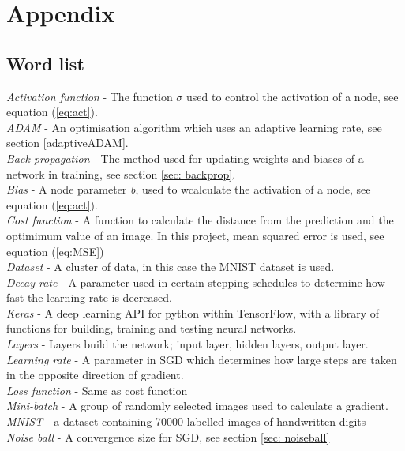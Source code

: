 \documentclass{article}
\begin{document}
\newpage
\section{Appendix}
\subsection{Word list}
\textit{Activation function} - The function $\sigma$ used to control the activation of a node, see equation (\ref{eq:act}).\\ [0.75ex]
\textit{ADAM} - An optimisation algorithm which uses an adaptive learning rate, see section \ref{adaptiveADAM}.\\[0.75ex]
\textit{Back propagation} - The method used for updating weights and biases of a network in training, see section \ref{sec: backprop}.\\[0.75ex]
\textit{Bias} - A node parameter \textit{b}, used to wcalculate the activation of a node, see equation (\ref{eq:act}).\\[0.75ex]
\textit{Cost function} - A function to calculate the distance from the prediction and the optimimum value of an image. In this project, mean squared error is used, see equation (\ref{eq:MSE}) \\[0.75ex]
\textit{Dataset} - A cluster of data, in this case the MNIST dataset is used.\\[0.75ex]
\textit{Decay rate} - A parameter used in certain stepping schedules to determine how fast the learning rate is decreased.\\[0.75ex]
\textit{Keras} - A deep learning API for python within TensorFlow, with a library of functions for building, training and testing neural networks.\\[0.75ex]
\textit{Layers} - Layers build the network; input layer, hidden layers, output layer. \\[0.75ex]
\textit{Learning rate} - A parameter in SGD which determines how large steps are taken in the opposite direction of gradient.\\[0.75ex]
\textit{Loss function} - Same as cost function\\[0.75ex]
\textit{Mini-batch} - A group of randomly selected images used to calculate a gradient. \\[0.75ex]
\textit{MNIST} - a dataset containing 70000 labelled images of handwritten digits\\[0.75ex]
\textit{Noise ball} - A convergence size for SGD, see section \ref{sec: noiseball}\\[0.75ex]
\end{document}
